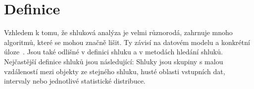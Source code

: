 \section{Definice}
Vzhledem k tomu, že shluková analýza je velmi různorodá, zahrnuje mnoho algoritmů, které se mohou značně lišit. Ty závisí na datovém modelu a konkrétní úloze~\cite{Aggarwal13}. Jsou také odlišné v definici shluku a v metodách hledání shluků. Nejčastější definice shluků jsou následující: Shluky jsou skupiny s malou vzdáleností mezi objekty ze stejného shluku, husté oblasti vstupních dat, intervaly nebo jednotlivé statistické distribuce.\\


